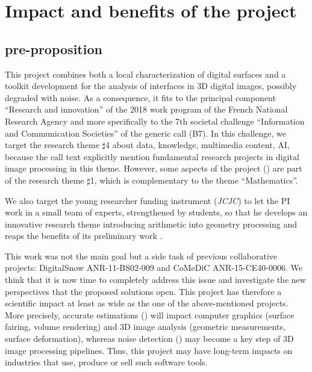 \section{Impact and benefits of the project}
\label{sec:impact}



\subsection{pre-proposition}

This project combines both a local characterization of digital surfaces 
and a toolkit development for the analysis of interfaces in 3D digital images, 
possibly degraded with noise. 
As a consequence, it fits to the principal component ``Research and innovation''
of the 2018 work program of the French National Research Agency 
and more specifically to the 7th societal challenge ``Information and Communication Societies''
of the generic call (B7).    
In this challenge, we target the research theme $\sharp$4 about data, knowledge, multimedia content, AI, 
because the call text explicitly mention fundamental research projects in digital image processing in this theme. However, some aspects of the project (\wpPattern) are part of the research theme $\sharp$1, 
which is complementary to the theme ``Mathematics''.    

We also target the young researcher funding instrument (\emph{JCJC}) 
to let the PI work in a small team of experts, strengthened by students, so that
he develops an innovative research theme introducing arithmetic into geometry processing and
reaps the benefits of its preliminary work \cite{LPRJMIV2017}. 


This work was not the main goal but a side task of previous collaborative projects: 
DigitalSnow ANR-11-BS02-009 and CoMeDiC ANR-15-CE40-0006. 
We think that it is now time to completely address this issue 
and investigate the new perspectives that the proposed solutions open. 
This project has therefore a scientific impact at least as wide as the one of the above-mentioned projects. 
More precisely, accurate estimations (\wpEstim)
will impact computer graphics (surface fairing, volume rendering)
and 3D image analysis (geometric measurements, surface deformation), 
whereas noise detection (\wpScale) may become a key step of 3D image processing pipelines.  
Thus, this project may have long-term impacts on industries that use, produce or sell such software tools. 


